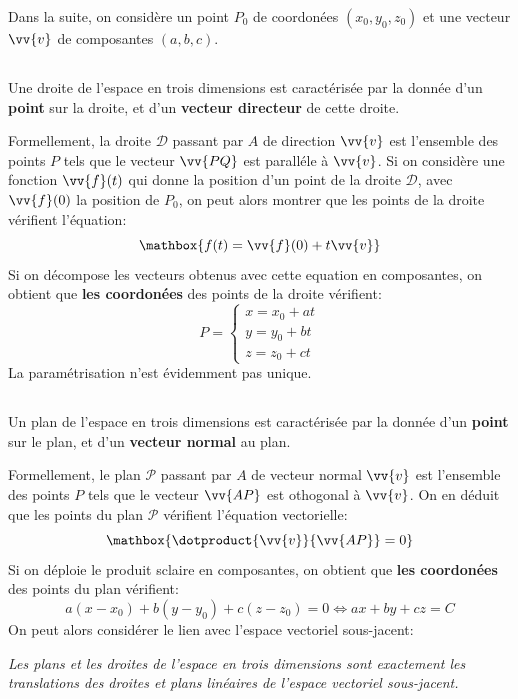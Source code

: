 Dans la suite, on considère un point \(P_0\) de coordonées \((x_0, y_0, z_0)\) et une vecteur \(\vv{v}\) de composantes \((a, b, c)\).

\subsection*{}
Une droite de l'espace en trois dimensions est caractérisée par la donnée d'un \textbf{point} sur la droite, et d'un \textbf{vecteur directeur} de cette droite.\<

Formellement, la droite \(\mathscr{D}\) passant par \(A\) de direction \(\vv{v}\) est l'ensemble des points \(P\) tels que le vecteur 
\(\vv{PQ}\) est paralléle à \(\vv{v}\).\+
Si on considère une fonction \(\vv{f}(t)\) qui donne la position d'un point de la droite \(\mathscr{D}\), avec \(\vv{f}(0)\) la position de \(P_0\), on peut alors montrer que les points de la droite vérifient l'équation:
\[
   \mathbox{f(t) = \vv{f}(0) + t\vv{v}}   
\]
Si on décompose les vecteurs obtenus avec cette equation en composantes, on obtient que \textbf{les coordonées} des points de la droite vérifient:
\[
   P = \begin{cases} 
      x = x_0 + at\\
      y = y_0 + bt\\
      z = z_0 + ct
   \end{cases} 
\]
La paramétrisation n'est évidemment pas unique.

\subsection*{}
Un plan de l'espace en trois dimensions est caractérisée par la donnée d'un \textbf{point} sur le plan, et d'un \textbf{vecteur normal} au plan.\<

Formellement, le plan \(\mathscr{P}\) passant par \(A\) de vecteur normal \(\vv{v}\) est l'ensemble des points \(P\) tels que le vecteur 
\(\vv{AP}\) est othogonal à \(\vv{v}\).\+
On en déduit que les points du plan \(\mathscr{P}\) vérifient l'équation vectorielle:
\[
   \mathbox{
      \dotproduct{\vv{v}}{\vv{AP}} = 0  
   }
\]
Si on déploie le produit sclaire en composantes, on obtient que \textbf{les coordonées} des points du plan vérifient:
\[
   a(x - x_0) + b(y - y_0) + c(z - z_0) = 0 \Longleftrightarrow ax + by + cz = C
\]
On peut alors considérer le lien avec l'espace vectoriel sous-jacent:
\begin{center}
   \textit{
      Les plans et les droites de l'espace en trois dimensions sont exactement les translations des droites et plans linéaires de l'espace vectoriel sous-jacent. 
   }
\end{center}

